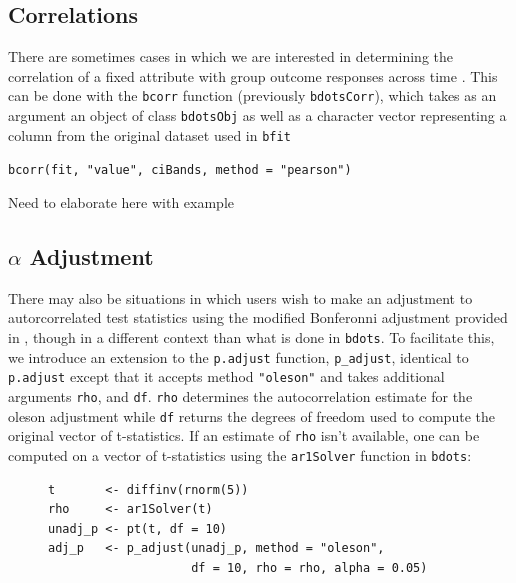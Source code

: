 \documentclass{article}
\newcommand{\xt}{\texttt}%
\begin{document}
\subsection{Correlations}

There are sometimes cases in which we are interested in determining the correlation of a fixed attribute with group outcome responses across time . This can be done with the \texttt{bcorr} function (previously \texttt{bdotsCorr}), which takes as an argument an object of class \texttt{bdotsObj} as well as a character vector representing a column from the original dataset used in \texttt{bfit}

\begin{center}
\xt{bcorr(fit, "value", ciBands, method = "pearson")} 
\end{center}

Need to elaborate here with example

\subsection{$\alpha$ Adjustment}

There may also be situations in which users wish to make an adjustment to autorcorrelated test statistics using the modified Bonferonni adjustment provided in \cite{oleson2017detecting}, though in a different context than what is done in \xt{bdots}. To facilitate this, we introduce an extension to the \texttt{p.adjust} function, \texttt{p\_adjust}, identical to \texttt{p.adjust} except that it accepts method \texttt{"oleson"} and takes additional arguments \texttt{rho}, and \texttt{df}. \texttt{rho} determines the autocorrelation estimate for the oleson adjustment while \texttt{df} returns the degrees of freedom used to compute the original vector of t-statistics. If an estimate of \texttt{rho} isn't available, one can be computed on a vector of t-statistics using the \texttt{ar1Solver} function in \xt{bdots}:


\begin{singlespace}
\begin{figure}[H]
\centering
\begin{BVerbatim}
t       <- diffinv(rnorm(5))
rho     <- ar1Solver(t)
unadj_p <- pt(t, df = 10)
adj_p   <- p_adjust(unadj_p, method = "oleson", 
                    df = 10, rho = rho, alpha = 0.05)
\end{BVerbatim}
\end{figure}
\end{singlespace}
\end{document}
